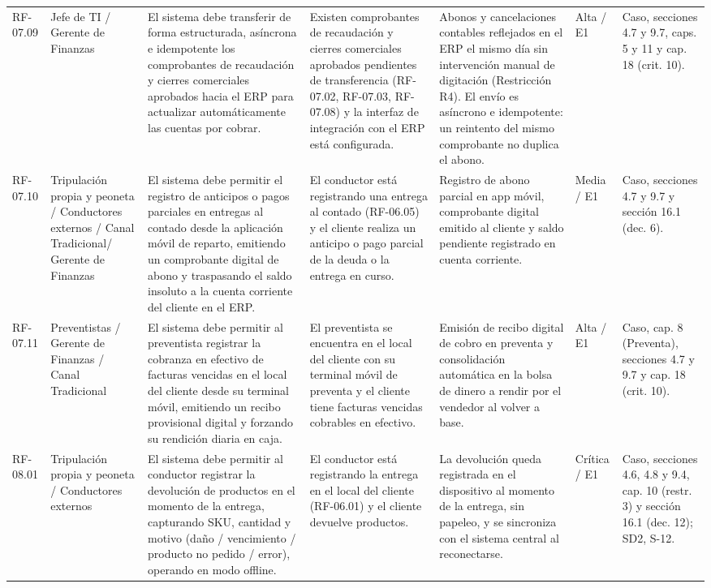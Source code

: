{\begin{longtable}{@{}F{0.062} F{0.080} F{0.195} F{0.160} F{0.240} F{0.093} F{0.170}@{}}
  RF-07.09 & Jefe de TI / Gerente de Finanzas & El sistema debe transferir de forma estructurada, asíncrona e idempotente los comprobantes de recaudación y cierres comerciales aprobados hacia el ERP para actualizar automáticamente las cuentas por cobrar. & Existen comprobantes de recaudación y cierres comerciales aprobados pendientes de transferencia (RF-07.02, RF-07.03, RF-07.08) y la interfaz de integración con el ERP está configurada. & Abonos y cancelaciones contables reflejados en el ERP el mismo día sin intervención manual de digitación (Restricción R4). El envío es asíncrono e idempotente: un reintento del mismo comprobante no duplica el abono. & Alta / E1 & Caso, secciones 4.7 y 9.7, caps. 5 y 11 y cap. 18 (crit. 10). \\
  RF-07.10 & Tripulación propia y peoneta / Conductores externos / Canal Tradicional/ Gerente de Finanzas & El sistema debe permitir el registro de anticipos o pagos parciales en entregas al contado desde la aplicación móvil de reparto, emitiendo un comprobante digital de abono y traspasando el saldo insoluto a la cuenta corriente del cliente en el ERP. & El conductor está registrando una entrega al contado (RF-06.05) y el cliente realiza un anticipo o pago parcial de la deuda o la entrega en curso. & Registro de abono parcial en app móvil, comprobante digital emitido al cliente y saldo pendiente registrado en cuenta corriente. & Media / E1 & Caso, secciones 4.7 y 9.7 y sección 16.1 (dec. 6). \\
  RF-07.11 & Preventistas / Gerente de Finanzas / Canal Tradicional & El sistema debe permitir al preventista registrar la cobranza en efectivo de facturas vencidas en el local del cliente desde su terminal móvil, emitiendo un recibo provisional digital y forzando su rendición diaria en caja. & El preventista se encuentra en el local del cliente con su terminal móvil de preventa y el cliente tiene facturas vencidas cobrables en efectivo. & Emisión de recibo digital de cobro en preventa y consolidación automática en la bolsa de dinero a rendir por el vendedor al volver a base. & Alta / E1 & Caso, cap. 8 (Preventa), secciones 4.7 y 9.7 y cap. 18 (crit. 10). \\
  RF-08.01 & Tripulación propia y peoneta / Conductores externos & El sistema debe permitir al conductor registrar la devolución de productos en el momento de la entrega, capturando SKU, cantidad y motivo (daño / vencimiento / producto no pedido / error), operando en modo offline. & El conductor está registrando la entrega en el local del cliente (RF-06.01) y el cliente devuelve productos. & La devolución queda registrada en el dispositivo al momento de la entrega, sin papeleo, y se sincroniza con el sistema central al reconectarse. & Crítica / E1 & Caso, secciones 4.6, 4.8 y 9.4, cap. 10 (restr. 3) y sección 16.1 (dec. 12); SD2, S-12. \\

\end{longtable}}
